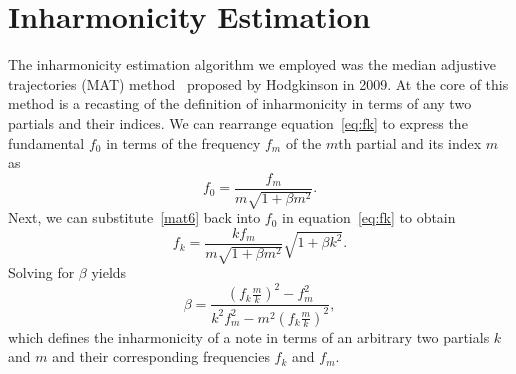 \documentclass[12pt]{cmuthesis}
\begin{document}
\section{Inharmonicity Estimation}
The inharmonicity estimation algorithm we employed was the median adjustive trajectories (MAT) method~\cite{hodgkinson2009} proposed by Hodgkinson in 2009. At the core of this method is a recasting of the definition of inharmonicity in terms of any two partials and their indices. We can rearrange equation~\eqref{eq:fk} to express the fundamental $f_0$ in terms of the frequency $f_m$ of the $m$th partial and its index $m$ as
\begin{equation}
\label{mat6}
f_0 = \frac{f_m}{m\sqrt{1+\beta m^2}}.
\end{equation}
Next, we can substitute~\eqref{mat6} back into $f_0$ in equation~\eqref{eq:fk} to obtain
\begin{equation}
\label{mat7}
f_k = \frac{kf_m}{m\sqrt{1+\beta m^2}}\sqrt{1+\beta k^2}.
\end{equation}
Solving for $\beta$ yields
\begin{equation}
\label{mat8}
\beta = \frac{(f_k\frac{m}{k})^2-f_m^2}{k^2f_m^2-m^2(f_k\frac{m}{k})^2},
\end{equation}
which defines the inharmonicity of a note in terms of an arbitrary two partials $k$ and $m$ and their corresponding frequencies $f_k$ and $f_m$.
\end{document}
